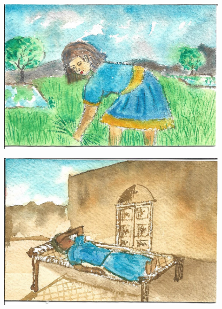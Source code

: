 \documentclass[12pt]{article}
\begin{document}
\newpage

\begin{figure}[h!]
\centering
\includegraphics[width=.7\paperwidth]{pictures/LW}
\end{figure}

\newpage

\begin{figure}[h!]
\centering
\includegraphics[width=.7\paperwidth]{pictures/LR}
\end{figure}

\newpage
\end{document}
